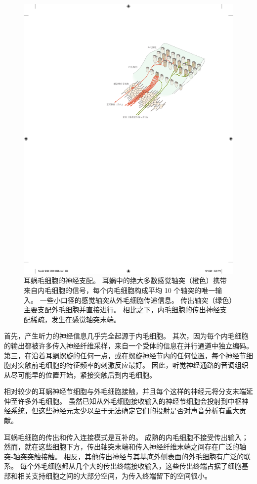 \begin{figure}[htbp]
	\centering
	\includegraphics[width=0.7\linewidth]{chap26/fig_26_17}
	\caption{耳蜗毛细胞的神经支配。
		耳蜗中的绝大多数感觉轴突（橙色）携带来自内毛细胞的信号，每个内毛细胞构成平均 10 个轴突的唯一输入。
		一些小口径的感觉轴突从外毛细胞传递信息。
		传出轴突（绿色）主要支配外毛细胞并直接进行。
		相比之下，内毛细胞的传出神经支配稀疏，发生在感觉轴突末端\cite{spoendlin1974neuroanatomy}。}
	\label{fig:26_17}
\end{figure}


首先，产生听力的神经信息几乎完全起源于内毛细胞。
其次，因为每个内毛细胞的输出都被许多传入神经纤维采样，来自一个受体的信息在并行通道中独立编码。
第三，在沿着耳蜗螺旋的任何一点，或在螺旋神经节内的任何位置，每个神经节细胞对突触前毛细胞的特征频率的刺激反应最好。
因此，听觉神经通路的音调组织从尽可能早的位置开始，紧接突触后到内毛细胞。


相对较少的耳蜗神经节细胞与外毛细胞接触，并且每个这样的神经元将分支末端延伸至许多外毛细胞。
虽然已知从外毛细胞接收输入的神经节细胞会投射到中枢神经系统，但这些神经元太少以至于无法确定它们的投射是否对声音分析有重大贡献。


耳蜗毛细胞的传出和传入连接模式是互补的。
成熟的内毛细胞不接受传出输入；
然而，就在这些细胞下方，传出轴突末端和传入神经纤维末端之间存在广泛的轴突-轴突突触接触。
相反，其他传出神经与其基底外侧表面的外毛细胞有广泛的联系。
每个外毛细胞都从几个大的传出终端接收输入，这些传出终端占据了细胞基部和相关支持细胞之间的大部分空间，为传入终端留下的空间很小。



